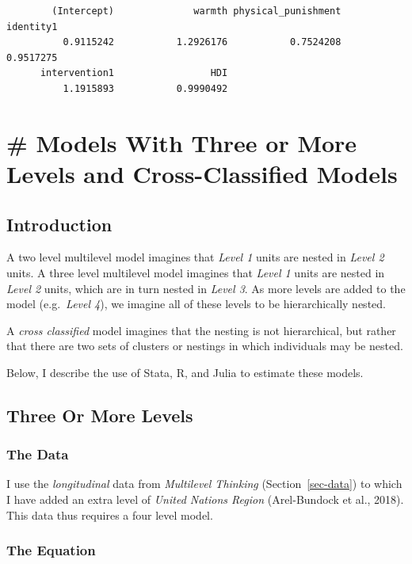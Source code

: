 \documentclass[
  letterpaper,
  DIV=11,
  numbers=noendperiod]{scrreprt}
\begin{document}
\begin{verbatim}
        (Intercept)              warmth physical_punishment           identity1 
          0.9115242           1.2926176           0.7524208           0.9517275 
      intervention1                 HDI 
          1.1915893           0.9990492 
\end{verbatim}


\chapter{\# Models With Three or More Levels and Cross-Classified
Models}\label{models-with-three-or-more-levels-and-cross-classified-models}

\section{Introduction}\label{introduction-1}

A two level multilevel model imagines that \emph{Level 1} units are
nested in \emph{Level 2} units. A three level multilevel model imagines
that \emph{Level 1} units are nested in \emph{Level 2} units, which are
in turn nested in \emph{Level 3}. As more levels are added to the model
(e.g.~\emph{Level 4}), we imagine all of these levels to be
hierarchically nested.

A \emph{cross classified} model imagines that the nesting is not
hierarchical, but rather that there are two sets of clusters or nestings
in which individuals may be nested.

Below, I describe the use of Stata, R, and Julia to estimate these
models.

\section{Three Or More Levels}\label{sec-fourlevel}

\subsection{The Data}\label{the-data-2}

I use the \emph{longitudinal} data from \emph{Multilevel Thinking}
(Section~\ref{sec-data}) to which I have added an extra level of
\emph{United Nations Region} (Arel-Bundock et al., 2018). This data thus
requires a four level model.

\subsection{The Equation}\label{the-equation-5}
\end{document}

